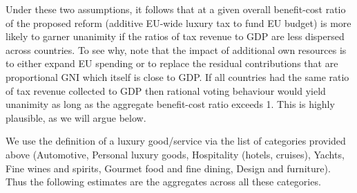 \documentclass{article}
\begin{document}
Under these two assumptions, it follows that at a given overall benefit-cost ratio of the proposed reform (additive EU-wide luxury tax to fund EU budget) is more likely to garner unanimity if the ratios of tax revenue to GDP are less dispersed across countries. To see why, note that the impact of additional own resources is to either expand EU spending or to replace the residual contributions that are proportional GNI which itself is close to GDP. If all countries had the same ratio of tax revenue collected to GDP then rational voting behaviour would yield unanimity as long as the aggregate benefit-cost ratio exceeds 1. This is highly plausible, as we will argue below. 

We use the definition of a luxury good/service via the list of categories provided above (Automotive, Personal luxury goods, Hospitality (hotels, cruises), Yachts, Fine wines and spirits, Gourmet food and fine dining, Design and furniture). Thus the following estimates are the aggregates across all these categories.  
\providecommand{\EUR}[1]{\mbox{\texteuro#1}}
\end{document}
